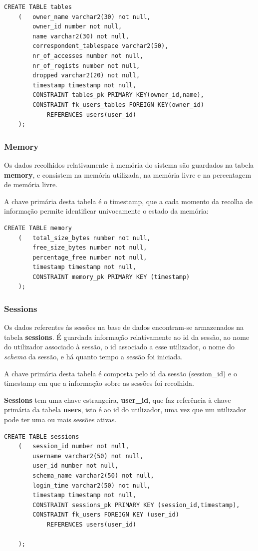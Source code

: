 \begin{verbatim}
CREATE TABLE tables
    (   owner_name varchar2(30) not null,
        owner_id number not null,
        name varchar2(30) not null,
        correspondent_tablespace varchar2(50),
        nr_of_accesses number not null,
        nr_of_regists number not null,
        dropped varchar2(20) not null,
        timestamp timestamp not null,
        CONSTRAINT tables_pk PRIMARY KEY(owner_id,name),
        CONSTRAINT fk_users_tables FOREIGN KEY(owner_id)
            REFERENCES users(user_id)        
    );
\end{verbatim}
\subsubsection*{Memory}

Os dados recolhidos relativamente à memória do sistema são guardados na tabela \textbf{memory}, e consistem na memória utilizada, na memória livre e na percentagem de memória livre.

A chave primária desta tabela é o timestamp, que a cada momento da recolha de informação permite identificar univocamente o estado da memória:
\begin{verbatim}
CREATE TABLE memory
    (   total_size_bytes number not null,
        free_size_bytes number not null,
        percentage_free number not null,
        timestamp timestamp not null,
        CONSTRAINT memory_pk PRIMARY KEY (timestamp)
    );
\end{verbatim}
\subsubsection*{Sessions}

Os dados referentes às sessões na base de dados encontram-se armazenados na tabela \textbf{sessions}. É guardada informação relativamente ao id da sessão, ao nome do utilizador associado à sessão, o id associado a esse utilizador, o nome do \textit{schema} da sessão, e há quanto tempo a sessão foi iniciada.

A chave primária desta tabela é composta pelo id da sessão (session\_id) e o timestamp em que a informação sobre as sessões foi recolhida.

\textbf{Sessions} tem uma chave estrangeira, \textbf{user\_id}, que faz referência à chave primária da tabela \textbf{users}, isto é ao id do utilizador, uma vez que um utilizador pode ter uma ou mais sessões ativas.

\begin{verbatim}
CREATE TABLE sessions
    (   session_id number not null,
        username varchar2(50) not null,
        user_id number not null,
        schema_name varchar2(50) not null,
        login_time varchar2(50) not null,
        timestamp timestamp not null,
        CONSTRAINT sessions_pk PRIMARY KEY (session_id,timestamp),
        CONSTRAINT fk_users FOREIGN KEY (user_id)
            REFERENCES users(user_id)
        
    );
\end{verbatim}
